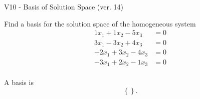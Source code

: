 \begin{exercise}
  \begin{exerciseTitle}V10 - Basis of Solution Space (ver. 14)\end{exerciseTitle}
  \begin{exerciseStatement}
    Find a basis for the solution space of the homogeneous system 
\begin{align*}
 1 x_ 1 + 1 x_ 2 -5 x_ 3 &= 0  \\ 
  3 x_ 1 -3 x_ 2 + 4 x_ 3 &= 0  \\ 
  -2 x_ 1 + 3 x_ 2 -4 x_ 3 &= 0  \\ 
  -3 x_ 1 + 2 x_ 2 -1 x_ 3 &= 0  \\ 
 \end{align*}


 
  \end{exerciseStatement}

  \begin{exerciseAnswer}
   A basis is   
\[\left\{\right\}.\]

  


  \end{exerciseAnswer}
\end{exercise}